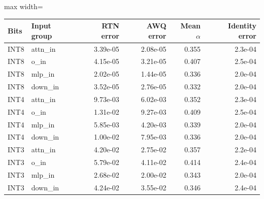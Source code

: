 \scriptsize
\setlength{\tabcolsep}{3.5pt}
\label{tab:t1awq}
\begin{adjustbox}{max width=\linewidth}
\begin{tabular}{llrrrr}
\toprule
Bits & Input group & RTN error & AWQ error & Mean $\alpha$ & Identity error \\
\midrule
INT8 & attn\_in & 3.39e-05 & 2.08e-05 & 0.355 & 2.3e-04 \\
INT8 & o\_in & 4.15e-05 & 3.21e-05 & 0.407 & 2.5e-04 \\
INT8 & mlp\_in & 2.02e-05 & 1.44e-05 & 0.336 & 2.0e-04 \\
INT8 & down\_in & 3.52e-05 & 2.76e-05 & 0.332 & 2.0e-04 \\
INT4 & attn\_in & 9.73e-03 & 6.02e-03 & 0.352 & 2.3e-04 \\
INT4 & o\_in & 1.31e-02 & 9.27e-03 & 0.409 & 2.5e-04 \\
INT4 & mlp\_in & 5.85e-03 & 4.20e-03 & 0.339 & 2.0e-04 \\
INT4 & down\_in & 1.00e-02 & 7.95e-03 & 0.336 & 2.0e-04 \\
INT3 & attn\_in & 4.20e-02 & 2.75e-02 & 0.357 & 2.2e-04 \\
INT3 & o\_in & 5.79e-02 & 4.11e-02 & 0.414 & 2.4e-04 \\
INT3 & mlp\_in & 2.68e-02 & 2.00e-02 & 0.343 & 2.0e-04 \\
INT3 & down\_in & 4.24e-02 & 3.55e-02 & 0.346 & 2.4e-04 \\
\bottomrule
\end{tabular}
\end{adjustbox}
